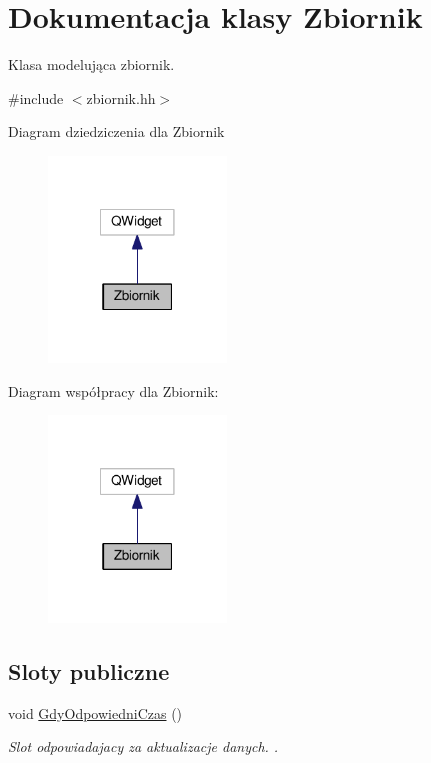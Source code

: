 \hypertarget{class_zbiornik}{}\section{Dokumentacja klasy Zbiornik}
\label{class_zbiornik}


Klasa modelująca zbiornik.  




{\ttfamily \#include $<$zbiornik.\+hh$>$}



Diagram dziedziczenia dla Zbiornik\nopagebreak
\begin{figure}[H]
\begin{center}
\leavevmode
\includegraphics[width=134pt]{class_zbiornik__inherit__graph}
\end{center}
\end{figure}


Diagram współpracy dla Zbiornik\+:\nopagebreak
\begin{figure}[H]
\begin{center}
\leavevmode
\includegraphics[width=134pt]{class_zbiornik__coll__graph}
\end{center}
\end{figure}
\subsection*{Sloty publiczne}
\begin{DoxyCompactItemize}
\item 
void \hyperlink{class_zbiornik_aa07ceb0fcbf307f0aa1eb75c32f3f47e}{Gdy\+Odpowiedni\+Czas} ()
\begin{DoxyCompactList}\small\item\em Slot odpowiadajacy za aktualizacje danych. . \end{DoxyCompactList}\end{DoxyCompactItemize}
